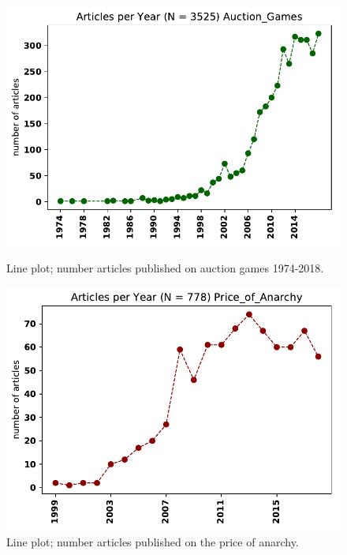 \documentclass{article}
\theoremstyle{definition}
\begin{document}
\begin{figure}[!hbtp]
    \begin{minipage}{.45\textwidth}
        \centering
        \includegraphics[width=\textwidth]{./assets/images/Auction_Games.pdf}
        \caption{Line plot; number articles published on auction games 1974-2018.}\label{fig:timeseries_ag}
    \end{minipage}%
    \begin{minipage}{.45\textwidth}
        \centering
        \includegraphics[width=\textwidth]{./assets/images/Price_of_Anarchy.pdf}
        \caption{Line plot; number articles published on the price of anarchy.}\label{fig:timeseries_pa}
    \end{minipage}
    \end{figure}
\end{document}
